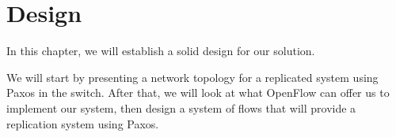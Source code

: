 \chapter{Design}
\label{chapter:design}

In this chapter, we will establish a solid design for our solution.

We will start by presenting a network topology for a replicated system using
Paxos in the switch.  After that, we will look at what OpenFlow can offer us
to implement our system, then design a system of flows that will provide a
replication system using Paxos.



